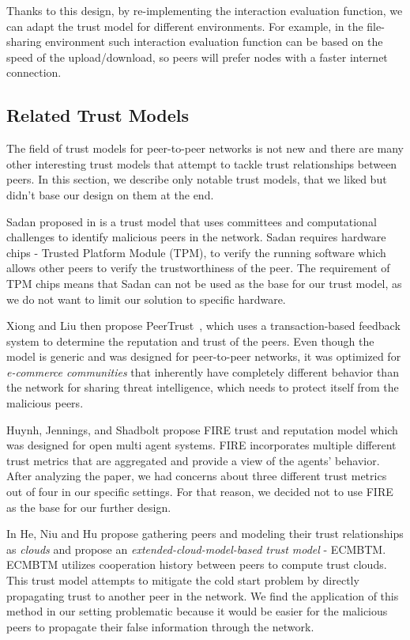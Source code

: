 Thanks to this design, by re-implementing the interaction evaluation function, we can adapt the trust model for different environments.
For example, in the file-sharing environment such interaction evaluation function can be based on the speed of the upload/download, so peers will prefer nodes with a faster internet connection.


\subsection{Related Trust Models}
\label{subsec:related-trust-models}
The field of trust models for peer-to-peer networks is not new and there are many other interesting trust models that attempt to tackle trust relationships between peers.
In this section, we describe only notable trust models, that we liked but didn't base our design on them at the end.

Sadan proposed in \cite{abera2019sadan} is a trust model that uses committees and computational challenges to identify malicious peers in the network.
Sadan requires hardware chips - Trusted Platform Module (TPM), to verify the running software which allows other peers to verify the trustworthiness of the peer.
The requirement of TPM chips means that Sadan can not be used as the base for our trust model, as we do not want to limit our solution to specific hardware.

Xiong and Liu then propose PeerTrust~\cite{xiong2004peertrust}, which uses a transaction-based feedback system to determine the reputation and trust of the peers.
Even though the model is generic and was designed for peer-to-peer networks, it was optimized for \textit{e-commerce communities} that inherently have completely different behavior than the network for sharing threat intelligence, which needs to protect itself from the malicious peers.

Huynh, Jennings, and Shadbolt propose FIRE trust and reputation model \cite{huynh2006integrated} which was designed for open multi agent systems.
FIRE incorporates multiple different trust metrics that are aggregated and provide a view of the agents' behavior.
After analyzing the paper, we had concerns about three different trust metrics out of four in our specific settings.
For that reason, we decided not to use FIRE as the base for our further design.

In \cite{1562680} He, Niu and Hu propose gathering peers and modeling their trust relationships as \textit{clouds} and propose an \textit{extended-cloud-model-based trust model} - ECMBTM.
ECMBTM utilizes cooperation history between peers to compute trust clouds. 
This trust model attempts to mitigate the cold start problem by directly propagating trust to another peer in the network.
We find the application of this method in our setting problematic because it would be easier for the malicious peers to propagate their false information through the network.

